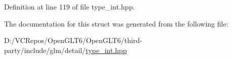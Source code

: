Definition at line 119 of file type\+\_\+int.\+hpp.



The documentation for this struct was generated from the following file\+:\begin{DoxyCompactItemize}
\item 
D\+:/\+V\+C\+Repos/\+Open\+G\+L\+T6/\+Open\+G\+L\+T6/third-\/party/include/glm/detail/\mbox{\hyperlink{type__int_8hpp}{type\+\_\+int.\+hpp}}\end{DoxyCompactItemize}
